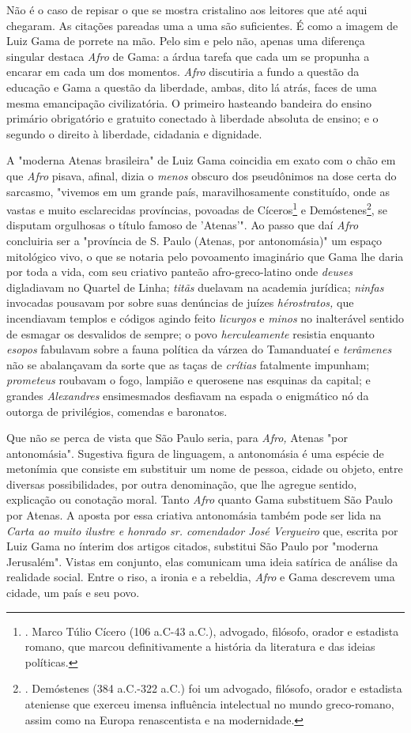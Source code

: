 Não é o caso de repisar o que se mostra cristalino aos leitores que até
aqui chegaram. As citações pareadas uma a uma são suficientes. É como a
imagem de Luiz Gama de porrete na mão. Pelo sim e pelo não, apenas uma
diferença singular destaca \emph{Afro} de Gama: a árdua tarefa que cada
um se propunha a encarar em cada um dos momentos. \emph{Afro} discutiria
a fundo a questão da educação e Gama a questão da liberdade, ambas, dito
lá atrás, faces de uma mesma emancipação civilizatória. O primeiro
hasteando bandeira do ensino primário obrigatório e gratuito conectado à
liberdade absoluta de ensino; e o segundo o direito à liberdade,
cidadania e dignidade.

A "moderna Atenas brasileira" de Luiz Gama coincidia em exato com o chão
em que \emph{Afro} pisava, afinal, dizia o \emph{menos} obscuro dos
pseudônimos na dose certa do sarcasmo, "vivemos em um grande país,
maravilhosamente constituído, onde as vastas e muito esclarecidas
províncias, povoadas de Cíceros\footnote{. Marco Túlio Cícero (106
  a.C-43 a.C.), advogado, filósofo, orador e estadista romano, que
  marcou definitivamente a história da literatura e das ideias
  políticas.} e Demóstenes\footnote{. Demóstenes (384 a.C.-322 a.C.) foi
  um advogado, filósofo, orador e estadista ateniense que exerceu imensa
  influência intelectual no mundo greco-romano, assim como na Europa
  renascentista e na modernidade.}, se disputam orgulhosas o título
famoso de 'Atenas'". Ao passo que daí \emph{Afro} concluiria ser a
"província de S. Paulo (Atenas, por antonomásia)" um espaço mitológico
vivo, o que se notaria pelo povoamento imaginário que Gama lhe daria por
toda a vida, com seu criativo panteão afro-greco-latino onde
\emph{deuses} digladiavam no Quartel de Linha; \emph{titãs} duelavam na
academia jurídica; \emph{ninfas} invocadas pousavam por sobre suas
denúncias de juízes \emph{hérostratos,} que incendiavam templos e
códigos agindo feito \emph{licurgos} e \emph{minos} no inalterável
sentido de esmagar os desvalidos de sempre; o povo \emph{herculeamente}
resistia enquanto \emph{esopos} fabulavam sobre a fauna política da
várzea do Tamanduateí e \emph{terâmenes} não se abalançavam da sorte que
as taças de \emph{crítias} fatalmente impunham; \emph{prometeus}
roubavam o fogo, lampião e querosene nas esquinas da capital; e grandes
\emph{Alexandres} ensimesmados desfiavam na espada o enigmático nó da
outorga de privilégios, comendas e baronatos.

Que não se perca de vista que São Paulo seria, para \emph{Afro,} Atenas
"por antonomásia". Sugestiva figura de linguagem, a antonomásia é uma
espécie de metonímia que consiste em substituir um nome de pessoa,
cidade ou objeto, entre diversas possibilidades, por outra denominação,
que lhe agregue sentido, explicação ou conotação moral. Tanto
\emph{Afro} quanto Gama substituem São Paulo por Atenas. A aposta por
essa criativa antonomásia também pode ser lida na \emph{Carta ao muito
ilustre e honrado sr. comendador José Vergueiro} que, escrita por Luiz
Gama no ínterim dos artigos citados, substitui São Paulo por "moderna
Jerusalém". Vistas em conjunto, elas comunicam uma ideia satírica de
análise da realidade social. Entre o riso, a ironia e a rebeldia,
\emph{Afro} e Gama descrevem uma cidade, um país e seu povo.

